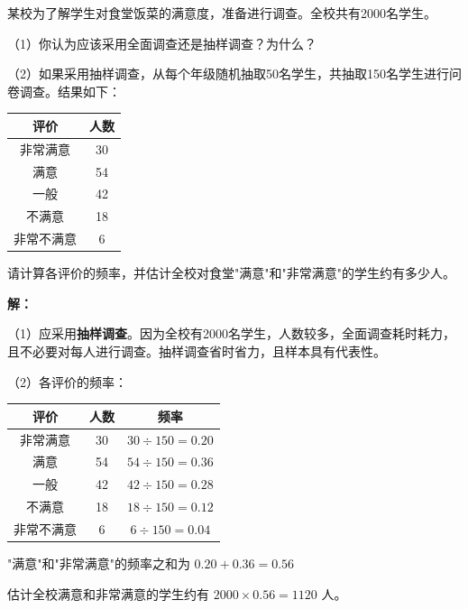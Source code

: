 \documentclass[12pt, a4paper]{ctexart}
\begin{document}
\begin{appbox}[【应用1】学校食堂调查]
某校为了解学生对食堂饭菜的满意度，准备进行调查。全校共有2000名学生。

（1）你认为应该采用全面调查还是抽样调查？为什么？

（2）如果采用抽样调查，从每个年级随机抽取50名学生，共抽取150名学生进行问卷调查。结果如下：

\begin{center}
\begin{tabular}{|c|c|}
\hline
评价 & 人数 \\
\hline
非常满意 & 30 \\
\hline
满意 & 54 \\
\hline
一般 & 42 \\
\hline
不满意 & 18 \\
\hline
非常不满意 & 6 \\
\hline
\end{tabular}
\end{center}

请计算各评价的频率，并估计全校对食堂"满意"和"非常满意"的学生约有多少人。

\textbf{解：}

（1）应采用\textbf{抽样调查}。因为全校有2000名学生，人数较多，全面调查耗时耗力，且不必要对每人进行调查。抽样调查省时省力，且样本具有代表性。

（2）各评价的频率：

\begin{center}
\begin{tabular}{|c|c|c|}
\hline
评价 & 人数 & 频率 \\
\hline
非常满意 & 30 & $30 \div 150 = 0.20$ \\
\hline
满意 & 54 & $54 \div 150 = 0.36$ \\
\hline
一般 & 42 & $42 \div 150 = 0.28$ \\
\hline
不满意 & 18 & $18 \div 150 = 0.12$ \\
\hline
非常不满意 & 6 & $6 \div 150 = 0.04$ \\
\hline
\end{tabular}
\end{center}

"满意"和"非常满意"的频率之和为 $0.20 + 0.36 = 0.56$

估计全校满意和非常满意的学生约有 $2000 \times 0.56 = 1120$ 人。
\end{appbox}
\end{document}
